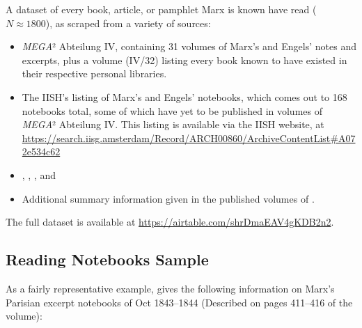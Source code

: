 A dataset of every book, article, or pamphlet Marx is known have read ($N \approx 1800$), as scraped from a variety of sources:
\begin{itemize}
    \item \textit{MEGA}² Abteilung IV, containing 31 volumes of Marx's and Engels' notes and excerpts, plus a volume (IV/32) listing every book known to have existed in their respective personal libraries.
    \item The IISH's listing of Marx's and Engels' notebooks, which comes out to 168 notebooks total, some of which have yet to be published in volumes of \textit{MEGA}² Abteilung IV. This listing is available via the IISH website, at \url{https://search.iisg.amsterdam/Record/ARCH00860/ArchiveContentList#A072e534c62}
    \item \cite{rubel_les_1957}, \cite{rubel_les_1960}, \cite{rubel_marx_1975}, and \cite{rubel_marx_1980}
    \item Additional summary information given in the published volumes of \justoldmega{}.
\end{itemize}

\noindent The full dataset is available at \href{https://airtable.com/shrDmaEAV4gKDB2n2}{https://airtable.com/shrDmaEAV4gKDB2n2}.


\subsection*{Reading Notebooks Sample}

As a fairly representative example,  gives the following information on Marx's Parisian excerpt notebooks of Oct 1843--1844 (Described on pages 411--416 of the volume):

